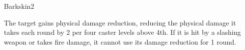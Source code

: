 \begin{spellsection}{Barkskin}{2}
\begin{spellheader}
\end{spellheader}
\begin{spellcontent}
    \begin{spelltargetinginfo}
    \end{spelltargetinginfo}
    \begin{spelleffects}
        \spelleffect The target gains physical damage reduction, reducing the physical damage it takes each round by 2  per four caster levels above 4th. If it is hit by a slashing weapon or takes fire damage, it cannot use its damage reduction for 1 round.
        \spelldur \durshort
    \end{spelleffects}
\end{spellcontent}
\begin{spellfooter}
\end{spellfooter}
\end{spellsection}

